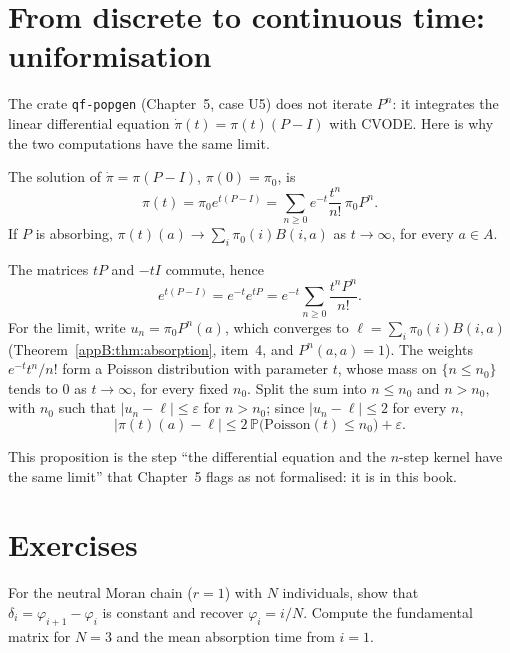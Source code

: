 \section{From discrete to continuous time: uniformisation}\label{appB:sec:unif}

The crate \texttt{qf-popgen} (Chapter~5, case U5) does not iterate $P^n$: it integrates the linear differential equation
$\dot\pi(t)=\pi(t)(P-I)$ with CVODE. Here is why the two computations have the same limit.

\begin{proposition}\label{appB:prop:unif}
The solution of $\dot\pi=\pi(P-I)$, $\pi(0)=\pi_0$, is
\[\pi(t)=\pi_0e^{t(P-I)}=\sum_{n\ge0}e^{-t}\frac{t^n}{n!}\,\pi_0P^n .\]
If $P$ is absorbing, $\pi(t)(a)\to\sum_i\pi_0(i)B(i,a)$ as $t\to\infty$, for every $a\in A$.
\end{proposition}

\begin{humanproof}
The matrices $tP$ and $-tI$ commute, hence
\[e^{t(P-I)}=e^{-t}e^{tP}=e^{-t}\sum_{n\ge0}\frac{t^nP^n}{n!} .\]
For the limit, write
$u_n=\pi_0P^n(a)$, which converges to $\ell=\sum_i\pi_0(i)B(i,a)$ (Theorem~\ref{appB:thm:absorption}, item~4, and
$P^n(a,a)=1$). The weights $e^{-t}t^n/n!$ form a Poisson distribution with parameter $t$, whose mass on $\{n\le n_0\}$
tends to $0$ as $t\to\infty$, for every fixed $n_0$. Split the sum into $n\le n_0$ and $n>n_0$, with $n_0$ such that
$|u_n-\ell|\le\varepsilon$ for $n>n_0$; since $|u_n-\ell|\le2$ for every $n$,
\[|\pi(t)(a)-\ell|\le2\,\mathbb P\bigl(\mathrm{Poisson}(t)\le n_0\bigr)+\varepsilon .\]
\end{humanproof}
This proposition is the step ``the differential equation and the $n$-step kernel have the same limit'' that Chapter~5
flags as not formalised: it is \tierC{} in this book.

\section{Exercises}\label{appB:sec:exos}

\begin{exercise}
For the neutral Moran chain ($r=1$) with $N$ individuals, show that $\delta_i=\varphi_{i+1}-\varphi_i$ is constant and
recover $\varphi_i=i/N$. Compute the fundamental matrix for $N=3$ and the mean absorption time from $i=1$.
\end{exercise}

